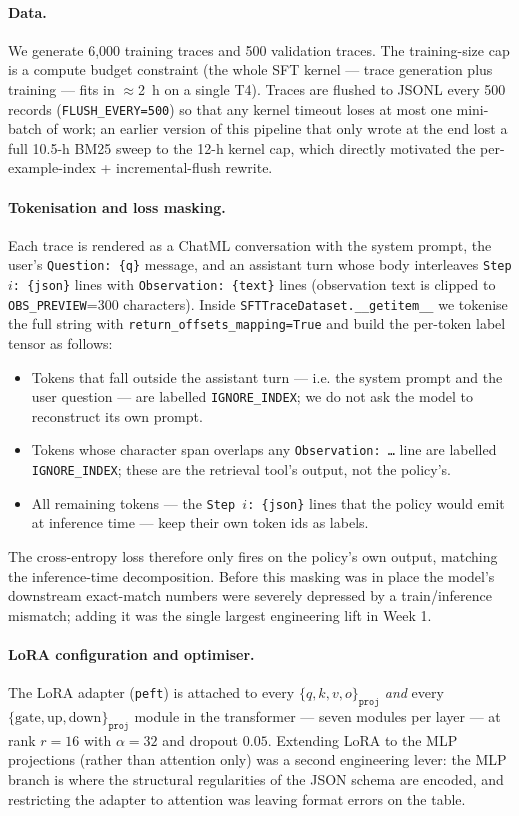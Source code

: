 \documentclass[11pt]{article}
\begin{document}
\paragraph{Data.}
We generate 6,000 training traces and 500 validation traces. The
training-size cap is a compute budget constraint (the whole SFT
kernel --- trace generation plus training --- fits in $\approx$2~h on
a single T4). Traces are flushed to JSONL every 500 records
(\texttt{FLUSH\_EVERY=500}) so that any kernel timeout loses at most
one mini-batch of work; an earlier version of this pipeline that only
wrote at the end lost a full 10.5-h BM25 sweep to the 12-h kernel cap,
which directly motivated the per-example-index + incremental-flush
rewrite.

\paragraph{Tokenisation and loss masking.}
Each trace is rendered as a ChatML conversation with the system prompt,
the user's \texttt{Question: \{q\}} message, and an assistant turn whose
body interleaves \texttt{Step $i$: \{json\}} lines with
\texttt{Observation: \{text\}} lines (observation text is clipped to
\texttt{OBS\_PREVIEW}=300 characters). Inside
\texttt{SFTTraceDataset.\_\_getitem\_\_} we tokenise the full string
with \texttt{return\_offsets\_mapping=True} and build the per-token
label tensor as follows:
\begin{itemize}
  \item Tokens that fall outside the assistant turn --- i.e. the system
  prompt and the user question --- are labelled \texttt{IGNORE\_INDEX};
  we do not ask the model to reconstruct its own prompt.
  \item Tokens whose character span overlaps any
  \texttt{Observation: \ldots} line are labelled \texttt{IGNORE\_INDEX};
  these are the retrieval tool's output, not the policy's.
  \item All remaining tokens --- the \texttt{Step $i$: \{json\}} lines
  that the policy would emit at inference time --- keep their own token
  ids as labels.
\end{itemize}
The cross-entropy loss therefore only fires on the policy's own output,
matching the inference-time decomposition. Before this masking was in
place the model's downstream exact-match numbers were severely depressed
by a train/inference mismatch; adding it was the single largest
engineering lift in Week 1.

\paragraph{LoRA configuration and optimiser.}
The LoRA adapter (\texttt{peft}) is attached to every
$\{q,k,v,o\}_\texttt{proj}$ \emph{and} every
$\{\text{gate},\text{up},\text{down}\}_\texttt{proj}$ module in the
transformer --- seven modules per layer --- at rank $r{=}16$ with
$\alpha{=}32$ and dropout $0.05$. Extending LoRA to the MLP
projections (rather than attention only) was a second engineering
lever: the MLP branch is where the structural regularities of the
JSON schema are encoded, and restricting the adapter to attention was
leaving format errors on the table.
\end{document}
